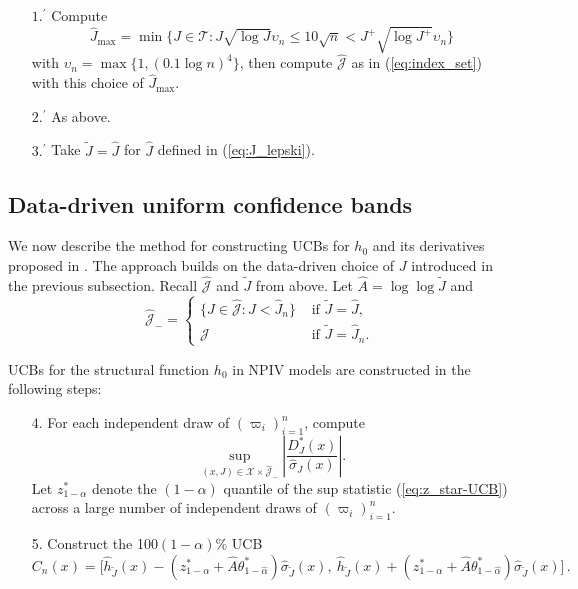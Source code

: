 \documentclass[
]{jss}
\begin{document}
\begin{enumerate}
\item[$1.^{\prime}$] Compute
\begin{equation} \label{eq:J_hat_max_regression}
 \hat{J}_{\max} = \min \bigg \{ J \in \mathcal T :   J \sqrt{\log J} \upsilon_n \leq 10 \sqrt n <  J^{+} \sqrt{\log J^{+}} \upsilon_n  \bigg \}
\end{equation}
with $\upsilon_n = \max\{1, (0.1 \log n)^4\}$, then compute $\hat{\mathcal J}$ as in (\ref{eq:index_set}) with this choice of $\hat J_{\max}$.
\item[$2.^{\prime}$] As above.
\item[$3.^{\prime}$] Take $\tilde J = \hat J$ for $\hat J$ defined in (\ref{eq:J_lepski}).
\end{enumerate}

\hypertarget{data-driven-uniform-confidence-bands}{%
\subsection{Data-driven uniform confidence
bands}\label{data-driven-uniform-confidence-bands}}

We now describe the method for constructing UCBs for \(h_0\) and its
derivatives proposed in \citet{CCK}. The approach builds on the
data-driven choice of \(J\) introduced in the previous subsection.
Recall \(\hat{\mathcal J}\) and \(\tilde J\) from above. Let
\(\hat A = \log \log \tilde J\) and \[
 \hat{\mathcal J}_{-} =
 \begin{cases}
 \{J \in \hat{\mathcal J} : J < \hat J_n\} & \mbox{~if $\tilde J = \hat J$}, \\
 \hat{\mathcal J} & \mbox{~if $\tilde J = \hat J_n$}.
 \end{cases}
\]

UCBs for the structural function \(h_0\) in NPIV models are constructed
in the following steps:

\begin{enumerate}
\item[4.] For each independent draw of $(\varpi_i)_{i=1}^n$, compute
\begin{equation} \label{eq:z_star-UCB}
 \sup_{(x,J) \in \mathcal{X} \times \hat{\mathcal J}_{-}} \left| \frac{D_J^*(x)}{\hat \sigma_J(x)} \right|.
\end{equation}
Let $z_{1-\alpha}^*$ denote the $(1-\alpha )$ quantile of the sup statistic (\ref{eq:z_star-UCB}) across a large number of independent draws of $(\varpi_i)_{i=1}^n$.
\item[5.] Construct the 100$(1-\alpha)$\% UCB
\begin{equation} \label{band}
 C_n(x) = \bigg[ \hat{h}_{\tilde{J}}(x) - \left( z_{1-\alpha}^* + \hat A \theta^*_{1-\hat \alpha}  \right ) \hat \sigma_{\tilde J}(x) , ~  \hat{h}_{\tilde{J}}(x) + \left( z_{1-\alpha}^* + \hat A \theta^*_{1-\hat \alpha}  \right) \hat \sigma_{\tilde J}(x) \bigg] \,.
\end{equation}
\end{enumerate}
\end{document}
